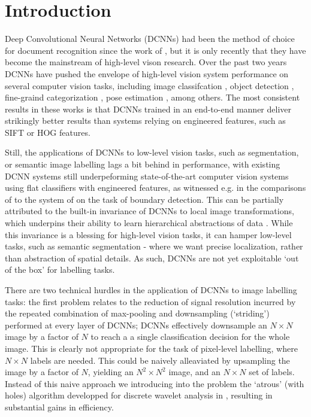 \section{Introduction}
\label{sec:intro}
Deep Convolutional Neural Networks (DCNNs) had been the method of choice for document recognition since the work of \citet{LeCun1998}, but 
it is only recently that they have become the mainstream of high-level vison research.
Over the past two years  DCNNs have pushed the envelope of high-level vision system performance on several computer vision tasks, including image classifcation \citet{KrizhevskyNIPS2013, papandreou2014untangling, sermanet2013overfeat, simonyan2014very, szegedy2014going}, object detection \citet{girshick2014rcnn}, fine-graind categorization \citet{zhang2014part}, pose estimation \citet{chen2014articulated, tompson2014joint}, among others.
The most consistent results in these works is that DCNNs trained in an end-to-end manner  deliver  strikingly better results than systems relying on engineered features, such as SIFT or HOG features.

Still, the applications of DCNNs to low-level vision tasks, such as segmentation, or semantic image labelling  lags a bit behind in performance, with existing DCNN systems still underpeforming  state-of-the-art  computer vision systems using flat classifiers with engineered features, as witnessed e.g. in the comparisons of \cite{williams14} to the system of \cite{DollarZ13} on the task of boundary detection. 
 This can be partially attributed to the built-in  invariance of DCNNs to local image transformations, which underpins their ability to learn hierarchical abstractions of data \citep{zeiler2014visualizing}.
While this invariance is a blessing for high-level vision tasks, it can hamper low-level tasks, such as semantic segmentation - where we want precise localization, rather than abstraction of spatial details.  As such, DCNNs are not yet exploitable `out of the box' for labelling tasks. 

There are two technical hurdles in the application of DCNNs to image labelling tasks: the first problem relates to the reduction of signal resolution incurred by the repeated combination of max-pooling and downsampling (`striding') performed at every layer of DCNNs; DCNNs effectively downsample an $N\times N$ image by a factor of $N$ to reach a 
a single  classification decision for the whole image. This is clearly not appropriate for the task of pixel-level labelling, where $N \times N$ labels are needed. This could  be naively alleaviated by upsampling the image by a factor of $N$, yielding an $N^2\times N^2$ image, and an $N\times N$ set of labels. Instead of this naive approach we introducing into the problem the `atrous' (with holes) algorithm developped for  discrete wavelet analysis in \cite{}, resulting in substantial gains in efficiency. 



